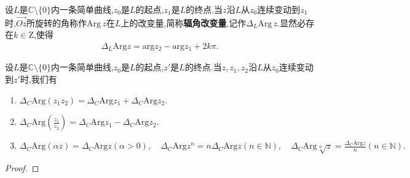 \documentclass[../../main.tex]{subfiles}%
\begin{document}
\begin{definition}
设$L$是$\mathbb{C} \setminus \{0\}$内一条简单曲线,$z_0$是$L$的起点,$z_1$是$L$的终点.当$z$沿$L$从$z_0$连续变动到$z_1$时,$\overrightarrow{Oz}$所旋转的角称作$\mathrm{Arg}\, z$在$L$上的改变量,简称\textbf{辐角改变量},记作$\Delta_L \mathrm{Arg}\, z$.显然必存在$k\in \mathrm{Z}$,使得
\begin{align*}
\Delta _L\mathrm{Arg}z=\mathrm{arg}z_2-\mathrm{arg}z_1+2k\pi .
\end{align*}
\end{definition}

\begin{theorem}
设$L$是$\mathbb{C} \setminus \{0\}$内一条简单曲线,$z_0$是$L$的起点,$z'$是$L$的终点.当$z,z_1,z_2$沿$L$从$z_0$连续变动到$z'$时,我们有
\begin{enumerate}[(1)]
\item $\Delta _C\mathrm{Arg}(z_1z_2)=\Delta _C\mathrm{Arg}z_1+\Delta _C\mathrm{Arg}z_2.$

\item $\Delta _C\mathrm{Arg}\left( \frac{z_1}{z_2} \right) =\Delta _C\mathrm{Arg}z_1-\Delta _C\mathrm{Arg}z_2.$

\item $\Delta _C\mathrm{Arg}\left( \alpha z \right) =\Delta _C\mathrm{Arg}z\left( \alpha >0 \right) ,\quad \Delta _C\mathrm{Arg}z^n=n\Delta _C\mathrm{Arg}z\left( n\in \mathbb{N} \right) ,\quad \Delta _C\mathrm{Arg}\sqrt[n]{z}=\frac{\Delta _C\mathrm{Arg}z}{n}\left( n\in \mathbb{N} \right) .$
\end{enumerate}
\end{theorem}
\begin{proof}

\end{proof}
\end{document}
